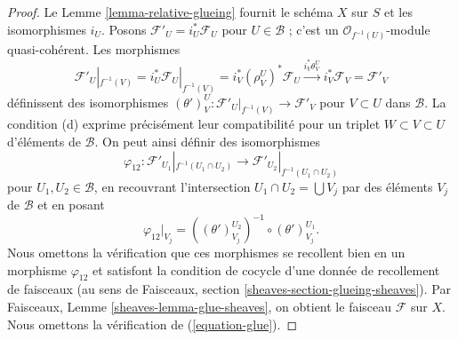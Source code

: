 \begin{proof}
Le Lemme \ref{lemma-relative-glueing} fournit le schéma $X$ sur $S$ et les
isomorphismes $i_U$. Posons $\mathcal{F}'_U = i_U^*\mathcal{F}_U$
pour $U \in \mathcal{B}$ ; c'est un
$\mathcal{O}_{f^{-1}(U)}$-module quasi-cohérent. Les morphismes
$$
\mathcal{F}'_U|_{f^{-1}(V)} =
i_U^*\mathcal{F}_U|_{f^{-1}(V)} =
i_V^*(\rho^U_V)^*\mathcal{F}_U \xrightarrow{i_V^*\theta^U_V}
i_V^*\mathcal{F}_V = \mathcal{F}'_V
$$
définissent des isomorphismes
$(\theta')^U_V : \mathcal{F}'_U|_{f^{-1}(V)} \to \mathcal{F}'_V$
pour $V \subset U$ dans $\mathcal{B}$.
La condition (d) exprime précisément
leur compatibilité pour un triplet $W \subset V \subset U$ d'éléments de
$\mathcal{B}$. On peut ainsi définir des isomorphismes
$$
\varphi_{12} :
\mathcal{F}'_{U_1}|_{f^{-1}(U_1 \cap U_2)}
\longrightarrow
\mathcal{F}'_{U_2}|_{f^{-1}(U_1 \cap U_2)}
$$
pour $U_1, U_2 \in \mathcal{B}$, en recouvrant l'intersection
$U_1 \cap U_2 = \bigcup V_j$ par des éléments $V_j$ de $\mathcal{B}$ et en
posant
$$
\varphi_{12}|_{V_j} =
\left((\theta')^{U_2}_{V_j}\right)^{-1}
\circ
(\theta')^{U_1}_{V_j}.
$$
Nous omettons la vérification que ces morphismes se recollent bien en un
morphisme $\varphi_{12}$ et satisfont
la condition de cocycle d'une donnée
de recollement de faisceaux (au sens de Faisceaux,
section \ref{sheaves-section-glueing-sheaves}). Par Faisceaux,
Lemme \ref{sheaves-lemma-glue-sheaves}, on obtient le faisceau
$\mathcal{F}$ sur $X$. Nous omettons la vérification de
(\ref{equation-glue}).
\end{proof}

